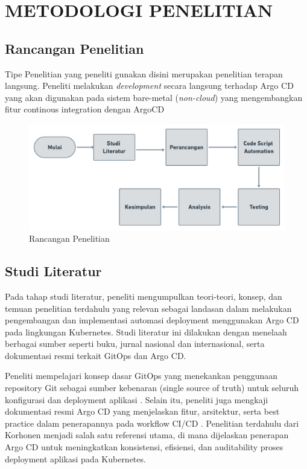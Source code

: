\renewcommand{\chaptername}{BAB}
\chapter{METODOLOGI PENELITIAN}

\vspace{4.5pt}
\setlength{\parskip}{0.5em}
\section{Rancangan Penelitian}\label{sec:rancangan_penelitian}
Tipe Penelitian yang peneliti gunakan disini merupakan penelitian terapan langsung. Peneliti melakukan
\textit{development} secara langsung terhadap Argo CD yang akan digunakan pada sistem bare-metal (\textit{non-cloud}) yang mengembangkan fitur continous integration dengan ArgoCD

\begin{figure}[h]
    \centering
    \includegraphics[width=1\textwidth]{figures/Tahapan Skripsi.png}
    \caption{Rancangan Penelitian}
\end{figure}

\section{Studi Literatur}\label{sec:studi_literatur}
Pada tahap studi literatur, peneliti mengumpulkan teori-teori,
konsep, dan temuan penelitian terdahulu yang relevan sebagai landasan dalam melakukan pengembangan dan implementasi automasi deployment menggunakan Argo CD pada lingkungan Kubernetes.
Studi literatur ini dilakukan dengan menelaah berbagai sumber seperti buku, jurnal nasional dan internasional, serta dokumentasi resmi terkait GitOps dan Argo CD.

Peneliti mempelajari konsep dasar GitOps yang menekankan penggunaan repository Git sebagai sumber kebenaran (single source of truth) untuk seluruh konfigurasi dan deployment aplikasi \cite{Weaveworks2017}.
Selain itu, peneliti juga mengkaji dokumentasi resmi Argo CD yang menjelaskan fitur, arsitektur, serta best practice dalam penerapannya pada workflow CI/CD \cite{ArgoCDDocs}.
Penelitian terdahulu dari Korhonen \cite{Korhonen2021} menjadi salah satu referensi utama, di mana dijelaskan penerapan Argo CD untuk meningkatkan konsistensi, efisiensi, dan auditability proses deployment aplikasi pada Kubernetes.

